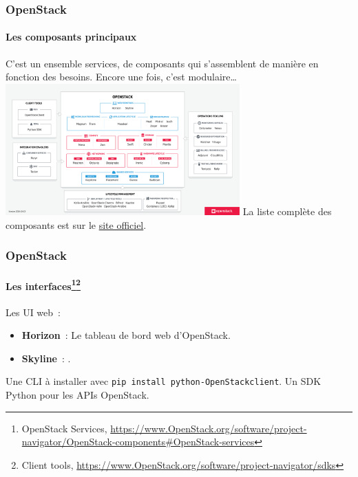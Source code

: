 \documentclass{beamer}
\begin{document}
    \begin{frame}
        \transdissolve
        \frametitle{OpenStack}
        \framesubtitle{Les composants principaux}
        C'est un ensemble services, de composants qui s'assemblent de manière  en fonction des besoins.
        Encore une fois, c'est modulaire\ldots
        \bigbreak
        \centering
        \includegraphics[width=9cm]{image/openstack-components}
        \bigbreak
        \flushleft
        La liste complète des composants est sur le \href{https://www.OpenStack.org/software/project-navigator/OpenStack-components\#OpenStack-services}{site officiel}.
    \end{frame}

    \begin{frame}
        \transdissolve
        \frametitle{OpenStack}
        \framesubtitle{Les interfaces\footnote{\label{OpenStackservices}OpenStack Services, \url{https://www.OpenStack.org/software/project-navigator/OpenStack-components\#OpenStack-services}}\footnote{Client tools, \url{https://www.OpenStack.org/software/project-navigator/sdks}}}
        Les UI web~:
        \begin{itemize}
            \item \textbf{Horizon}~: Le tableau de bord web d'OpenStack.
            \item \textbf{Skyline}~: .
        \end{itemize}
        \bigbreak
        Une CLI à installer avec \lstinline{pip install python-OpenStackclient}.
        \bigbreak
        Un SDK Python pour les APIs OpenStack.
    \end{frame}
\end{document}
